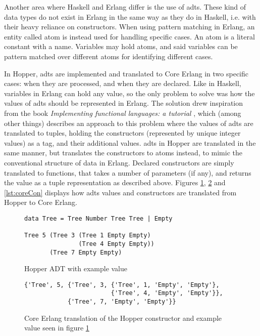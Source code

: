 Another area where Haskell and Erlang differ is the use of \glspl{adt}. These kind  %
of data types do not exist in Erlang in the same way as they do in Haskell, i.e. with their heavy reliance
on constructors. When using pattern matching in Erlang, an entity called atom is instead used for
handling specific cases. An atom is a literal constant with a name. Variables may hold atoms, and said variables can be pattern matched over different atoms for identifying different cases.

In Hopper, \glspl{adt} are implemented and translated to Core Erlang in two specific cases: when they are processed, and when they are declared. Like in Haskell, variables in Erlang can
hold any value, so the only problem to solve was how the values of \glspl{adt} should be represented in Erlang. The solution drew inspiration from the book \textit{Implementing functional languages: a tutorial} \cite{FunTutorial}, which (among other things) describes an approach to this problem where the values of \glspl{adt} are translated to tuples, holding the constructors (represented by unique integer values) as a tag, and their additional values. \Glspl{adt} in Hopper are translated in the same manner, but translates the constructors to atoms instead, to mimic the conventional structure of data in Erlang. Declared constructors are simply translated to functions, that takes a number of parameters (if any), and returns the value as a tuple representation as described above. Figures \ref{lst:hopperAdt}, \ref{lst:coreAdt} and \ref{lst:coreCon} displays how \glspl{adt} values and constructors are translated from Hopper to Core Erlang.

\begin{figure}[!htb]
\centering
\begin{lstlisting} 
data Tree = Tree Number Tree Tree | Empty

Tree 5 (Tree 3 (Tree 1 Empty Empty) 
               (Tree 4 Empty Empty)) 
       (Tree 7 Empty Empty)
\end{lstlisting}
\caption{Hopper ADT with example value}
\label{lst:hopperAdt}
\end{figure}

\begin{figure}[!htb]
\centering
\begin{lstlisting} 
{'Tree', 5, {'Tree', 3, {'Tree', 1, 'Empty', 'Empty'},
                        {'Tree', 4, 'Empty', 'Empty'}},
            {'Tree', 7, 'Empty', 'Empty'}}
\end{lstlisting}
\caption[Core Erlang translation of constructor and example value]
 {Core Erlang translation of the Hopper constructor and example value seen in figure \ref{lst:hopperAdt}}
\label{lst:coreAdt}
\end{figure}


